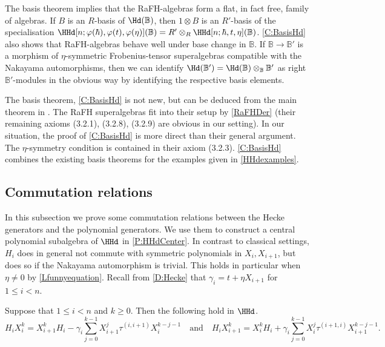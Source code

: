 \documentclass[a4paper,11pt]{amsart}
\numberwithin{equation}{subsection}
\theoremstyle{definition}
\theoremstyle{theorem}
\theoremstyle{remark}
\newcommand\RR{R}
\newcommand{\Bo}{\mathbb{B}}
\begin{document}
 \begin{Remark}\label{flatness}
 The basis theorem implies that the RaFH-algebras form a flat, in fact free, family of algebras. If $B$ is an $\RR$-basis of  $\Hd(\Bo)$, then  $1\otimes B$ is an $\RR'$-basis of the specialisation
$\HHd[n;\varphi(\hbar), \varphi(t), \varphi(\eta)](\Bo)=R'\otimes_R\HHd[n;\hbar, t, \eta](\Bo)$.
\autoref{C:BasisHd} also shows that RaFH-algebras behave well under base change in $\Bo$. If $\Bo\to\Bo'$ is a morphism of $\eta$-symmetric Frobenius-tensor superalgebras compatible with the Nakayama automorphisms, then  we can identify $\Hd(\Bo')=\Hd(\Bo)\otimes_{\Bo}\Bo'$ as right $\Bo'$-modules in the obvious way by identifying the respective basis elements.
\end{Remark}


\begin{Remark}
The basis theorem,  \autoref{C:BasisHd} is not new, but can be deduced from the main theorem in
\cite{CJNakanoXiang}. The RaFH superalgebras fit into their setup by \autoref{RaFHDer}
(their remaining axioms (3.2.1), (3.2.8), (3.2.9) are obvious in our setting).
In our situation, the proof of  \autoref{C:BasisHd} is
more direct than their general argument. The $\eta$-symmetry condition
is contained in their axiom (3.2.3). \autoref{C:BasisHd} combines the existing
basis theorems for the examples given in \autoref{HHdexamples}.
\end{Remark}

  \subsection{Commutation relations}
In this subsection we prove some commutation relations between the Hecke generators and the
polynomial generators. We use them to construct a central polynomial subalgebra of $\HHd$ in
\autoref{P:HHdCenter}.  In contrast to classical settings, $H_i$ does in general not commute with symmetric polynomials in $X_i, X_{i+1}$, but does so if the Nakayama automorphism is trivial. This holds  in particular when $\eta\ne0$ by \autoref{Lfunnyequation}. Recall from \autoref{D:Hecke} that $\gamma_i= t+\eta X_{i+1}$ for $1\le i<n$.

  \begin{Proposition}\label{L:RewriteXr}
   Suppose that $1\leq i<n$ and $k\ge0$. Then the following hold in $\HHd$.
   \begin{equation}
   \label{eq:RewriteXr}
       H_iX_i^k=X_{i+1}^kH_i -\gamma_i\sum_{j=0}^{k-1}X_{i+1}^j\tau^{(i,i+1)}X_{i}^{k-j-1}\quad\text{and}\quad
       H_iX_{i+1}^k=X_{i}^kH_i +\gamma_i\sum_{j=0}^{k-1}X_i^j\tau^{(i+1,i)}X_{i+1}^{k-j-1}.
   \end{equation}
  \end{Proposition}
\end{document}
